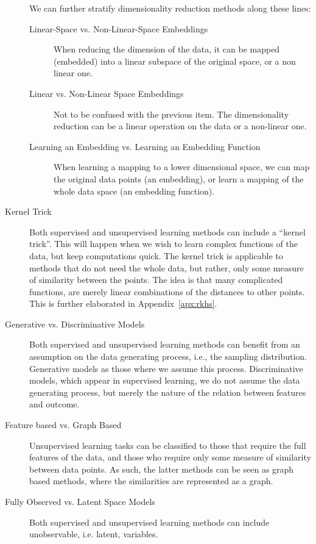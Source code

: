 \begin{description}
We can further stratify dimensionality reduction methods along these lines:
	\begin{description}
	\item[Linear-Space vs. Non-Linear-Space Embeddings] 
	When reducing the dimension of the data, it can be mapped (embedded) into a linear subspace of the original space, or a non linear one.
	
	\item[Linear vs. Non-Linear Space Embeddings]
	Not to be confused with the previous item. 
	The dimensionality reduction can be a linear operation on the data or a non-linear one.
	
	\item[Learning an Embedding vs. Learning an Embedding Function]
	When learning a mapping to a lower dimensional space, we can map the original data points (an embedding), or learn a mapping of the whole data space (an embedding function).
	\end{description}

\item[Kernel Trick]
Both supervised and unsupervised learning methods can include a ``kernel trick''. 
This will happen when we wish to learn complex functions of the data, but keep computations quick.
The kernel trick is applicable to methods that do not need the whole data, but rather, only some measure of similarity between the points. 
The idea is that many complicated functions, are merely linear combinations of the distances to other points.
This is further elaborated in Appendix~\ref{apx:rkhs}.

\item[Generative vs. Discriminative Models]
Both supervised and unsupervised learning methods can benefit from an assumption on the data generating process, i.e., the sampling distribution.
Generative models as those where we assume this process. 
Discriminative models, which appear in supervised learning, we do not assume the data generating process, but merely the nature of the relation between features and outcome.

\item[Feature based vs. Graph Based]
Unsupervised learning tasks can be classified to those that require the full features of the data, and those who require only some measure of similarity between data points. As such, the latter methods can be seen as graph based methods, where the similarities are represented as a graph.

\item[Fully Observed vs. Latent Space Models]
Both supervised and unsupervised learning methods can include unobservable, i.e. latent, variables.

\end{description}



